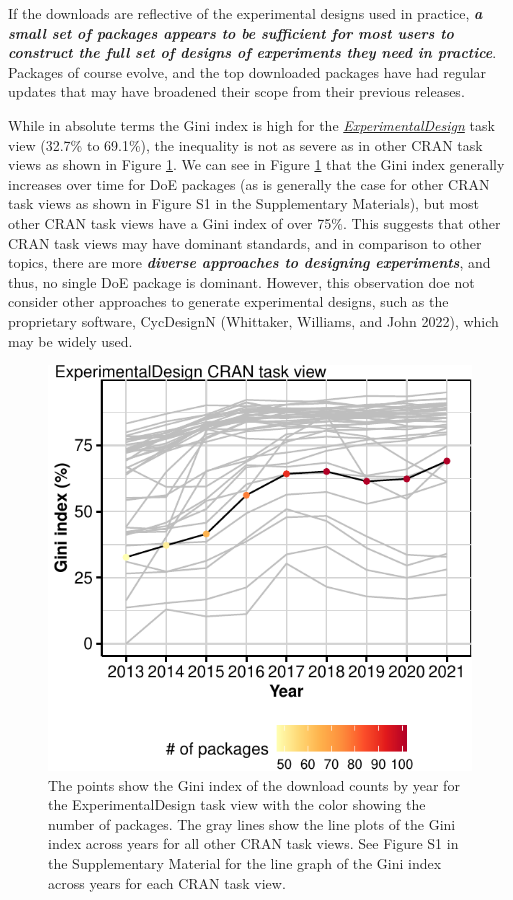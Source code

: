 \documentclass{article}
\begin{document}
If the downloads are reflective of the experimental designs used in
practice, \textbf{\emph{a small set of packages appears to be sufficient
for most users to construct the full set of designs of experiments they
need in practice}}. Packages of course evolve, and the top downloaded
packages have had regular updates that may have broadened their scope
from their previous releases.

While in absolute terms the Gini index is high for the
\href{http://CRAN.R-project.org/view=ExperimentalDesign}{\emph{ExperimentalDesign}}
task view (32.7\% to 69.1\%), the inequality is not as severe as in
other CRAN task views as shown in Figure \ref{fig:fig-gini-all-ctvs}. We
can see in Figure \ref{fig:fig-gini-all-ctvs} that the Gini index
generally increases over time for DoE packages (as is generally the case
for other CRAN task views as shown in Figure S1 in the Supplementary
Materials), but most other CRAN task views have a Gini index of over
75\%. This suggests that other CRAN task views may have dominant
standards, and in comparison to other topics, there are more
\textbf{\emph{diverse approaches to designing experiments}}, and thus,
no single DoE package is dominant. However, this observation doe not
consider other approaches to generate experimental designs, such as the
proprietary software, CycDesignN (Whittaker, Williams, and John 2022),
which may be widely used.

\begin{figure}[htbp]

{\centering \includegraphics{figures/fig-gini-all-ctvs-1} 

}

\caption{The points show the Gini index of the download counts by year for the ExperimentalDesign task view with the color showing the number of packages. The gray lines show the line plots of the Gini index across years for all other CRAN task views. See Figure S1 in the Supplementary Material for the line graph of the Gini index across years for each CRAN task view.}\label{fig:fig-gini-all-ctvs}
\end{figure}
\end{document}
